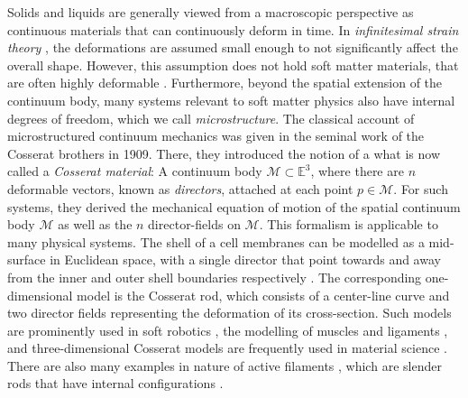 \documentclass[]{cam-thesis}
\begin{document}
Solids and liquids are generally viewed from a macroscopic perspective as continuous materials that can continuously deform in time. In \textit{infinitesimal strain theory} \citep{landauTheoryElasticityVolume1986}, the deformations are assumed small enough to not significantly affect the overall shape. However, this assumption does not hold soft matter materials, that are often highly deformable \citep{volokhMechanicsSoftMaterials2019}. Furthermore, beyond the spatial extension of the continuum body, many systems relevant to soft matter physics \citep{krishnaswamyCosserattypeModelRed1996, rangamaniSmallScaleMembrane2014, sackBiologicalTissueMechanics2016, zhangModelingSimulationComplex2019, corazzaUnravelingLoopingEfficiency2022} also have internal degrees of freedom, which we call \textit{microstructure}. The classical account of microstructured continuum mechanics was given in the seminal work of the Cosserat brothers \cite{cosseratTheoryDeformableBodies1909} in 1909. There, they introduced the notion of a what is now called a \textit{Cosserat material}: A continuum body $\mathcal{M} \subset \mathbb{E}^3$, where there are $n$ deformable vectors, known as \textit{directors}, attached at each point $p \in \mathcal{M}$. For such systems, they derived the mechanical equation of motion of the spatial continuum body $\mathcal{M}$ as well as the $n$ director-fields on $\mathcal{M}$. This formalism is applicable to many physical systems. The shell of a cell membranes can be modelled as a mid-surface in Euclidean space, with a single director that point towards and away from the inner and outer shell boundaries respectively \citep{krishnaswamyCosserattypeModelRed1996, rangamaniSmallScaleMembrane2014}. The corresponding one-dimensional model is the Cosserat rod, which consists of a center-line curve and two director fields representing the deformation of its cross-section. Such models are prominently used in soft robotics \citep{rendaDiscreteCosseratApproach2018, graziosoGeometricallyExactModel2019, rendaDiscreteCosseratApproach2016, caasenbroodEnergyShapingControllersSoft2022, boyerMacrocontinuousComputedTorque2006, boyerMacrocontinuousDynamicsHyperredundant2012, rendaDynamicModelMultibending2014, verlSoftRoboticsTransferring2015, naughtonElasticaCompliantMechanics2021}, the modelling of muscles and ligaments \citep{sackBiologicalTissueMechanics2016, zhangModelingSimulationComplex2019}, and three-dimensional Cosserat models are frequently used in material science \citep{stefanouCosseratApproachLocalization2017,
forestCosseratModellingSize2000,
altenbachCosseratMedia2013,
ebrahimianNumericalStudyInterface2021,
mohanFrictionalCosseratModel1999,
koteraCosseratContinuumTheory2000,
stefanouThreedimensionalCosseratHomogenization2008,
onckCosseratModelingCellular2002,
iesanDeformationPorousCosserat2011}. There are also many examples in nature of active filaments \citep{moultonElasticSecretsChameleon2016, oliveriTheoryDurotacticAxon2021, kierTonguesTentaclesTrunks1985, moultonMultiscaleIntegrationEnvironmental2020}, which are slender rods \citep{kirchhoffUeberGleichgewichtUnd1859, dillKirchhoffTheoryRods1992, gorielyNonlinearDynamicsFilaments2000} that have internal configurations \citep{kaczmarskiActiveFilamentsCurvature2022}.
\end{document}
